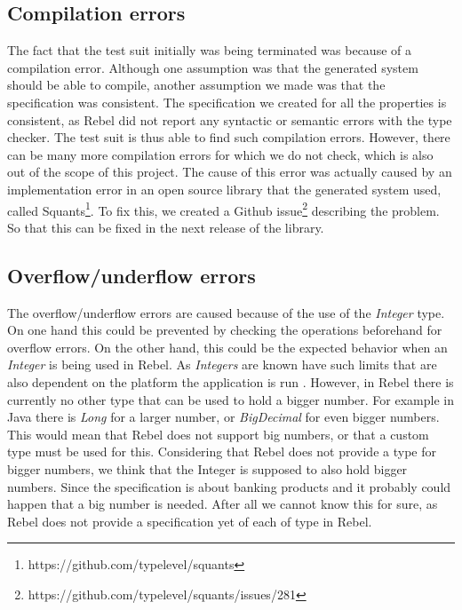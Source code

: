 \subsection*{Compilation errors}
The fact that the test suit initially was being terminated was because of a compilation error. Although one assumption was that the generated system should be able to compile, another assumption we made was that the specification was consistent. The specification we created for all the properties is consistent, as Rebel did not report any syntactic or semantic errors with the type checker. The test suit is thus able to find such compilation errors. However, there can be many more compilation errors for which we do not check, which is also out of the scope of this project. The cause of this error was actually caused by an implementation error in an open source library that the generated system used, called Squants\footnote{https://github.com/typelevel/squants}. To fix this, we created a Github issue\footnote{https://github.com/typelevel/squants/issues/281} describing the problem. So that this can be fixed in the next release of the library.

\subsection*{Overflow/underflow errors}
The overflow/underflow errors are caused because of the use of the \textit{Integer} type. On one hand this could be prevented by checking the operations beforehand for overflow errors. On the other hand, this could be the expected behavior when an \textit{Integer} is being used in Rebel. As \textit{Integers} are known have such limits that are also dependent on the platform the application is run . However, in Rebel there is currently no other type that can be used to hold a bigger number. For example in Java there is \textit{Long} for a larger number, or \textit{BigDecimal} for even bigger numbers. This would mean that Rebel does not support big numbers, or that a custom type must be used for this. Considering that Rebel does not provide a type for bigger numbers, we think that the Integer is supposed to also hold bigger numbers. Since the specification is about banking products and it probably could happen that a big number is needed. After all we cannot know this for sure, as Rebel does not provide a specification yet of each of type in Rebel.

